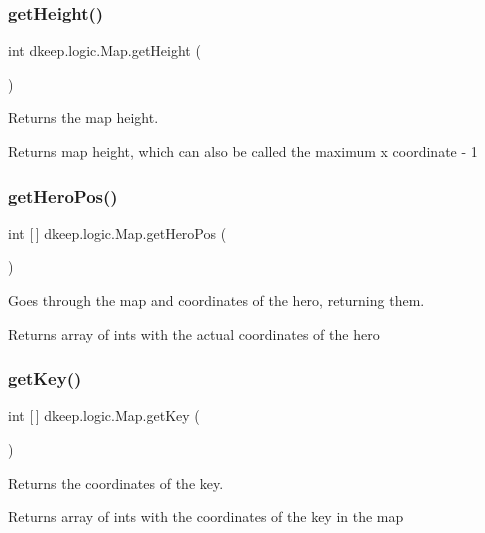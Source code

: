 \subsubsection{\texorpdfstring{get\+Height()}{getHeight()}}
{\footnotesize\ttfamily int dkeep.\+logic.\+Map.\+get\+Height (\begin{DoxyParamCaption}{ }\end{DoxyParamCaption})}

Returns the map height. \begin{DoxyReturn}{Returns}
map height, which can also be called the maximum x coordinate -\/ 1 
\end{DoxyReturn}
\mbox{\label{classdkeep_1_1logic_1_1_map_a94bbd79e68a9e0901cb129f9ef7bfa37}} 
\subsubsection{\texorpdfstring{get\+Hero\+Pos()}{getHeroPos()}}
{\footnotesize\ttfamily int \mbox{[}$\,$\mbox{]} dkeep.\+logic.\+Map.\+get\+Hero\+Pos (\begin{DoxyParamCaption}{ }\end{DoxyParamCaption})}

Goes through the map and coordinates of the hero, returning them. \begin{DoxyReturn}{Returns}
array of ints with the actual coordinates of the hero 
\end{DoxyReturn}
\mbox{\label{classdkeep_1_1logic_1_1_map_aba4049e879891996457634979ec146a7}} 
\subsubsection{\texorpdfstring{get\+Key()}{getKey()}}
{\footnotesize\ttfamily int \mbox{[}$\,$\mbox{]} dkeep.\+logic.\+Map.\+get\+Key (\begin{DoxyParamCaption}{ }\end{DoxyParamCaption})}

Returns the coordinates of the key. \begin{DoxyReturn}{Returns}
array of ints with the coordinates of the key in the map 
\end{DoxyReturn}
\mbox{\label{classdkeep_1_1logic_1_1_map_ab9624f3fa58049b3481f95e4c77277a3}} 
